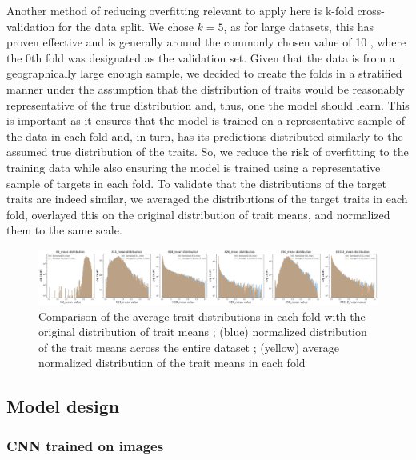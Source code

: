 \documentclass[12pt,a4paper,oneside]{article}
\begin{document}
\smallskip
Another method of reducing overfitting relevant to apply here is k-fold cross-validation for the data split. We chose $k=5$, as for large datasets, this has proven effective \cite{Marcot2021} and is generally around the commonly chosen value of 10 \cite{kequal10isgood}, where the 0th fold was designated as the validation set. Given that the data is from a geographically large enough sample, we decided to create the folds in a stratified manner under the assumption that the distribution of traits would be reasonably representative of the true distribution and, thus, one the model should learn. This is important as it ensures that the model is trained on a representative sample of the data in each fold and, in turn, has its predictions distributed similarly to the assumed true distribution of the traits. So, we reduce the risk of overfitting to the training data while also ensuring the model is trained using a representative sample of targets in each fold. To validate that the distributions of the target traits are indeed similar, we averaged the distributions of the target traits in each fold, overlayed this on the original distribution of trait means, and normalized them to the same scale.  

\begin{figure}[!h]
    \centering
    \includegraphics[width=1\textwidth]{assets/distribution_match_folds.png}
    \caption{Comparison of the average trait distributions in each fold with the original distribution of trait means ; (blue) normalized distribution of the trait means across the entire dataset ; (yellow) average normalized distribution of the trait means in each fold}
\end{figure}

\subsection{Model design}

\subsubsection{CNN trained on images}
\end{document}

